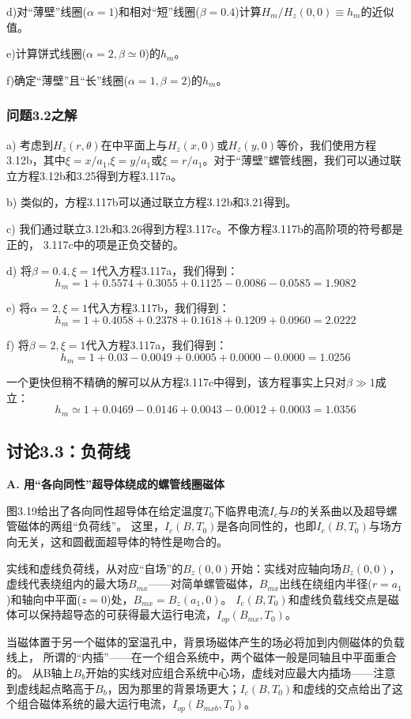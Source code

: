 d)对“薄壁”线圈($\alpha=1$)和相对“短”线圈($\beta=0.4$)计算$H_m/H_z(0, 0)\equiv h_m$的近似值。

e)计算饼式线圈($\alpha=2,\beta\simeq 0$)的$h_m$。

f)确定“薄壁”且“长”线圈($\alpha=1,\beta=2$)的$h_m$。 

\subsubsection{问题3.2之解}
a) 考虑到$H_z(r,\theta)$在中平面上与$H_z(x, 0)$或$H_z(y, 0)$等价，我们使用方程3.12b，其中$\xi = x/a_1$,$\xi = y/a_1$或$\xi = r/a_1$。对于“薄壁”螺管线圈，我们可以通过联立方程3.12b和3.25得到方程3.117a。

b) 类似的，方程3.117b可以通过联立方程3.12b和3.21得到。

c) 我们通过联立3.12b和3.26得到方程3.117c。不像方程3.117b的高阶项的符号都是正的，
3.117c中的项是正负交替的。 

d) 将$\beta=0.4,\xi=1$代入方程3.117a，我们得到：
$$h_m=1 + 0.5574 + 0.3055 + 0.1125 − 0.0086 − 0.0585 = 1.9082$$

e) 将$\alpha=2,\xi=1$代入方程3.117b，我们得到：
$$ h_m=1 + 0.4058 + 0.2378 + 0.1618 + 0.1209 + 0.0960 = 2.0222$$

f) 将$\beta=2,\xi=1$代入方程3.117a，我们得到：
$$ h_m=1 + 0.03 − 0.0049 + 0.0005 + 0.0000 − 0.0000 = 1.0256 $$

一个更快但稍不精确的解可以从方程3.117c中得到，该方程事实上只对$\beta\gg 1$成立：
$$h_m \simeq 1 + 0.0469 − 0.0146 + 0.0043 − 0.0012 + 0.0003 = 1.0356$$

\newpage

\subsection{讨论3.3：负荷线}
\textbf{A. 用“各向同性”超导体绕成的螺管线圈磁体}

图3.19给出了各向同性超导体在给定温度$T_0$下临界电流$I_c$与$B$的关系曲以及超导螺管磁体的两组“负荷线”。
这里，$I_c(B,T_0)$是各向同性的，也即$I_c(B,T_0)$与场方向无关，这和圆截面超导体的特性是吻合的。

实线和虚线负荷线，从对应“自场”的$B_z(0,0)$开始：实线对应轴向场$B_z(0,0)$，虚线代表绕组内的最大场$B_{mx}$——对简单螺管磁体，$B_{mx}$出线在绕组内半径($r=a_1$)和轴向中平面($z=0$)处，$B_{mx}=B_z(a_1,0)$。
$I_c(B,T_0)$和虚线负载线交点是磁体可以保持超导态的可获得最大运行电流，$I_{op}(B_{mx},T_0)$。

当磁体置于另一个磁体的室温孔中，背景场磁体产生的场必将加到内侧磁体的负载线上，
所谓的“内插”——在一个组合系统中，两个磁体一般是同轴且中平面重合的。
从B轴上$B_{b}$开始的实线对应组合系统中心场，虚线对应最大内插场——注意到虚线起点略高于$B_{b}$，因为那里的背景场更大；$I_c(B,T_0)$和虚线的交点给出了这个组合磁体系统的最大运行电流，$I_{op}(B_{mxb},T_0)$。

